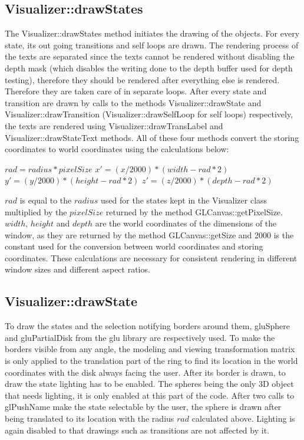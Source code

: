 \documentclass[a4paper]{article}
\begin{document}
\subsection{Visualizer::drawStates}
The Visualizer::drawStates method initiates the drawing of the objects. For every state, its out going transitions and self loops are drawn. The rendering process of the texts are separated since the texts cannot be rendered without disabling the depth mask (which disables the writing done to the depth buffer used for depth testing), therefore they should be rendered after everything else is rendered. Therefore they are taken care of in separate loops. After every state and transition are drawn by calls to the methods Visualizer::drawState and Visualizer::drawTransition (Visualizer::drawSelfLoop for self loops) respectively, the texts are rendered using Visualizer::drawTransLabel and Visualizer::drawStateText methods. All of these four methods convert the storing coordinates to world coordinates using the calculations below:
\begin{center}
\begin{math}
rad = radius * pixelSize
\end{math}
\begin{math}
x' = (x / 2000) * (width - rad * 2)
\end{math}
\begin{math}
y' = (y / 2000) * (height - rad * 2)
\end{math}
\begin{math}
z' = (z / 2000) * (depth - rad * 2)
\end{math}
\end{center}
$rad$ is equal to the $radius$ used for the states kept in the Visualizer class multiplied by the $pixelSize$ returned by the method GLCanvas::getPixelSize. $width$, $height$ and $depth$ are the world coordinates of the dimensions of the window, as they are returned by the method GLCanvas::getSize and 2000 is the constant used for the conversion between world coordinates and storing coordinates. These calculations are necessary for consistent rendering in different window sizes and different aspect ratios.
\subsection{Visualizer::drawState}
To draw the states and the selection notifying borders around them, gluSphere and gluPartialDisk from the glu library are respectively used. To make the borders visible from any angle, the modeling and viewing transformation matrix is only applied to the translation part of the ring to find its location in the world coordinates with the disk always facing the user. After its border is drawn, to draw the state lighting has to be enabled. The spheres being the only 3D object that needs lighting, it is only enabled at this part of the code. After two calls to glPushName make the state selectable by the user, the sphere is drawn after being translated to its location with the radius $rad$ calculated above. Lighting is again disabled to that drawings such as transitions are not affected by it.
\end{document}
